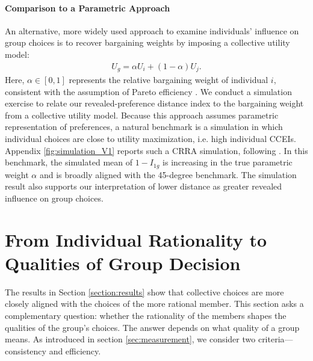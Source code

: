 \documentclass[11 pt]{article}
\begin{document}
\paragraph{Comparison to a Parametric Approach} An alternative, more widely used approach to examine individuals' influence on group choices is to recover bargaining weights by imposing a collective utility model:
\begin{align*}
U_g = \alpha U_i + (1-\alpha) U_j.
\end{align*}
Here, $\alpha \in [0,1]$ represents the relative bargaining weight of individual $i$, consistent with the assumption of Pareto efficiency \citep{Chiappori1988, chiappori1992collective}. We conduct a simulation exercise to relate our revealed-preference distance index to the bargaining weight from a collective utility model. Because this approach assumes parametric representation of preferences, a natural benchmark is a simulation in which individual choices are close to utility maximization, i.e. high individual CCEIs. Appendix \autoref{fig:simulation_V1} reports such a CRRA simulation, following \citet{Choietal:2007:AER}. In this benchmark, the simulated mean of $1-I_{1g}$ is increasing in the true parametric weight $\alpha$ and is broadly aligned with the 45-degree benchmark. The simulation result also supports our interpretation of lower distance as greater revealed influence on group choices.

\section{From Individual Rationality to Qualities of Group Decision}

The results in Section \ref{section:results} show that collective choices are more closely aligned with the choices of the more rational member. This section asks a complementary question: whether the rationality of the members shapes the qualities of the group's choices. The answer depends on what quality of a group means. As introduced in section \ref{sec:measurement}, we consider two criteria---consistency and efficiency.
\end{document}

